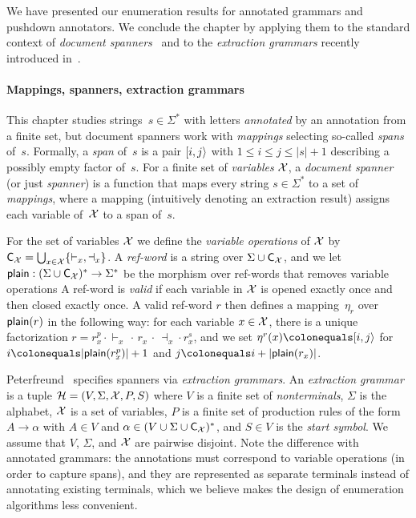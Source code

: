 %
%

%
%

We have presented our enumeration results for annotated grammars and
pushdown annotators. We conclude the chapter by applying them to the
standard context of \emph{document spanners}~\cite{FaginKRV15} and to the
\emph{extraction grammars} recently introduced in~\cite{Peterfreund21}.

\paragraph{Mappings, spanners, extraction grammars}
This chapter studies strings~$s \in \Sigma^*$ with letters
\emph{annotated} by an annotation from a finite set, but document spanners work
with \emph{mappings} selecting so-called \emph{spans} of~$s$. Formally, 
%
a \emph{span} of~$s$ is a pair 
%
$[i,j\rangle$ with $1 \leq i \leq j \leq |s|+1$ describing a
possibly empty factor of~$s$.
For a finite set of \emph{variables} $\mathcal{X}$,
%
a \emph{document spanner} (or just \emph{spanner}) is a
function that maps every string $s \in \Sigma^*$ to a set of \emph{mappings},
where a mapping (intuitively denoting an extraction result)
assigns each variable of~$\mathcal{X}$ to a span of~$s$.


\begin{definition}
  \label{gram:def:refwords}
For the set of variables $\mathcal{X}$ we define the \emph{variable operations} of $\mathcal{X}$ by
$\textsf{C}_{\mathcal{X}} = \bigcup_{x \in \mathcal{X}} \{ {\vdash_x}, {\dashv_x} \}$.
A \emph{ref-word} is a string over $\Sigma \cup \textsf{C}_{\mathcal{X}}$, and we let
  $\textsf{plain}: (\Sigma \cup \textsf{C}_{\mathcal{X}})^* \rightarrow \Sigma^*$ be the morphism
  over ref-words that removes variable operations
A ref-word is {\em valid} if each variable in $\mathcal{X}$ is opened exactly once and then closed exactly once.
A valid ref-word $r$ then defines a mapping~$\eta_r$ over $\textsf{plain}(r)$ in the following way:
for each variable $x \in \mathcal{X}$, there is a unique factorization $r = r_x^p \cdot \vdash_x \, \cdot \, r_x \, \cdot\, \dashv_x \cdot r_x^s$,
and we set 
$\eta^r(x) \colonequals \spanc{i}{j}$ for $i \colonequals |\splain(r_x^p)|+1$ and $j \colonequals i + |\splain(r_x)|$. 
\end{definition}

Peterfreund~\cite{Peterfreund21} specifies spanners via \emph{extraction
grammars}. An \emph{extraction grammar} is a tuple
$\mathcal{H} = (V, \Sigma, \mathcal{X}, P, \allowbreak S)$ where 
$V$ is a finite set of \emph{nonterminals},
$\Sigma$ is the alphabet,
$\mathcal{X}$ is a set of variables, 
$P$ is a finite set of production rules of the form $A \to \alpha$ with $A \in
V$ and $\alpha \in (V \cup \Sigma \cup \textsf{C}_{\mathcal{X}})^*$, and $S \in V$ is the
\emph{start symbol}.
We assume that $V$, $\Sigma$, and $\mathcal{X}$ are pairwise disjoint.
Note the difference with annotated grammars: the annotations must correspond to
variable operations (in order to capture spans), and they are represented as separate terminals
instead of annotating existing terminals, which we believe makes the design of
enumeration algorithms less convenient.

